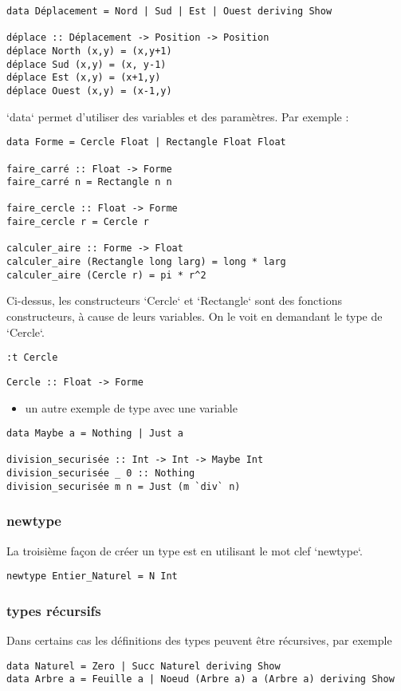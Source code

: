 \documentclass[11pt]{article}
\begin{document}
\begin{verbatim}
data Déplacement = Nord | Sud | Est | Ouest deriving Show

déplace :: Déplacement -> Position -> Position
déplace North (x,y) = (x,y+1)
déplace Sud (x,y) = (x, y-1)
déplace Est (x,y) = (x+1,y)
déplace Ouest (x,y) = (x-1,y)
\end{verbatim}
`data` permet d'utiliser des variables et des paramètres.  Par exemple :
\begin{verbatim}
data Forme = Cercle Float | Rectangle Float Float

faire_carré :: Float -> Forme
faire_carré n = Rectangle n n

faire_cercle :: Float -> Forme
faire_cercle r = Cercle r

calculer_aire :: Forme -> Float
calculer_aire (Rectangle long larg) = long * larg
calculer_aire (Cercle r) = pi * r^2
\end{verbatim}
Ci-dessus, les constructeurs `Cercle` et `Rectangle` sont des fonctions constructeurs, à cause de leurs variables.  On le voit en demandant le type de `Cercle`.
\begin{verbatim}
:t Cercle
\end{verbatim}
\begin{verbatim}
Cercle :: Float -> Forme
\end{verbatim}


\begin{itemize}
\item un autre exemple de type avec une variable
\end{itemize}
\begin{verbatim}
data Maybe a = Nothing | Just a

division_securisée :: Int -> Int -> Maybe Int
division_securisée _ 0 :: Nothing
division_securisée m n = Just (m `div` n)
\end{verbatim}

\subsubsection{newtype}
\label{sec:orgdc38d3f}
La troisième façon de créer un type est en utilisant le mot clef `newtype`.
\begin{verbatim}
newtype Entier_Naturel = N Int
\end{verbatim}

\subsubsection{types récursifs}
\label{sec:org31e04eb}
Dans certains cas les définitions des types peuvent être récursives, par exemple
\begin{verbatim}
data Naturel = Zero | Succ Naturel deriving Show
data Arbre a = Feuille a | Noeud (Arbre a) a (Arbre a) deriving Show
\end{verbatim}
\end{document}
